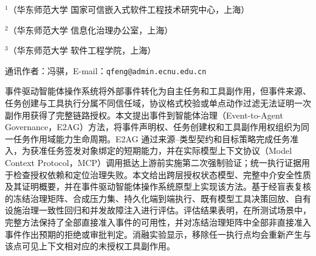 \thispagestyle{josfirst}

\vspace{2pt}

\vspace{7pt}

\vspace{4pt}
\begingroup\fontsize{8pt}{12pt}\selectfont
\noindent$^{1}$（华东师范大学 国家可信嵌入式软件工程技术研究中心，上海）\par
\noindent$^{2}$（华东师范大学 信息化治理办公室，上海）\par
\noindent$^{3}$（华东师范大学 软件工程学院，上海）\par
\noindent 通讯作者：冯骐，E-mail：\texttt{qfeng@admin.ecnu.edu.cn}\par
\endgroup

\begin{joszhabstract}
事件驱动智能体操作系统将外部事件转化为自主任务和工具副作用，但事件来源、任务创建与工具执行分属不同信任域，协议格式校验或单点动作过滤无法证明一次副作用获得了完整链路授权。本文提出事件到智能体治理（Event-to-Agent Governance，E2AG）方法，将事件声明权、任务创建权和工具副作用权组织为同一任务作用域能力生命周期。E2AG 通过来源--类型契约和目标策略完成任务准入，为获准任务签发对象绑定的短期能力，并在实际模型上下文协议（Model Context Protocol，MCP）调用抵达上游前实施第二次强制验证；统一执行证据用于检查授权依赖和定位治理失败。本文给出跨层授权状态模型、完整中介安全性质及其证明概要，并在事件驱动智能体操作系统原型上实现该方法。基于经盲表复核的冻结治理矩阵、合成压力集、持久化端到端执行、既有模型工具决策回放、自有设施治理一致性回归和并发故障注入进行评估。评估结果表明，在所测试场景中，完整方法保持了全部直接准入事件的可用性，并对冻结治理矩阵中全部非直接准入事件作出预期的拒绝或审批判定。消融实验显示，移除任一执行点均会重新产生与该点可见上下文相对应的未授权工具副作用。
\end{joszhabstract}

